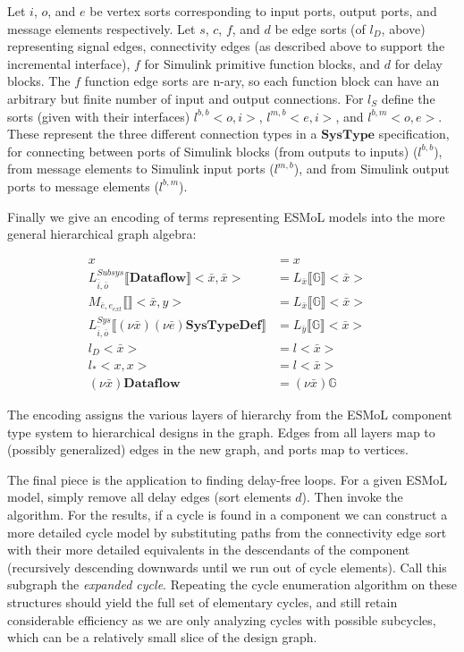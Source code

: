 Let $i$, $o$, and $e$ be vertex sorts corresponding to input ports, output 
ports, and message elements respectively.  Let $s$, $c$, $f$, and $d$ be
edge sorts (of $l_D$, above) representing signal edges, connectivity edges
(as described above to support the incremental interface), $f$ for Simulink
primitive function blocks, and $d$ for delay blocks.  The $f$ function edge
sorts are n-ary, so each function block can have an arbitrary but finite
number of input and output connections. For $l_S$ define the
sorts (given with their interfaces) $l^{b,b} < o, i >$, $l^{m,b} <e,i>$, 
and $l^{b,m} <o,e>$.  These represent the three different connection types in
a $\mathbf{SysType}$ specification, for connecting between ports of Simulink
blocks (from outputs to inputs) ($l^{b,b}$), from message elements to Simulink 
input ports ($l^{m,b}$), and from Simulink output ports to message elements
($l^{b,m}$).

Finally we give an encoding of terms representing ESMoL models into the more
general hierarchical graph algebra:

\begin{align}
x &= x & \nonumber \\
L_{\bar{i},\bar{o}}^{Subsys} \llbracket \mathbf{Dataflow} \rrbracket <\bar{x},\bar{x}> &= L_{\bar{x}} \llbracket \mathbb{G} \rrbracket < \bar{x} > & \nonumber \\
M_{\bar{e},e_{ext}} \llbracket \rrbracket <\bar{x}, y> &= L_{\bar{x}} \llbracket \mathbb{G} \rrbracket <\bar{x}> & \nonumber \\
L_{\bar{i},\bar{o}}^{Sys} \llbracket (\nu \bar{x})(\nu \bar{e}) \mathbf{SysTypeDef} \rrbracket &=  L_{\bar{y}} \llbracket \mathbb{G} \rrbracket <\bar{x}> & \\
l_D <\bar{x}> &= l <\bar{x}> & \nonumber \\
l_{*} <x,x> &= l <\bar{x}> & \nonumber \\
(\nu \bar{x}) \mathbf{Dataflow} &= (\nu \bar{x}) \mathbb{G} & \nonumber
\end{align}

The encoding assigns the various layers of hierarchy from the
ESMoL component type system to hierarchical designs in the graph.  Edges from
all layers map to (possibly generalized) edges in the new graph, and 
ports map to vertices.

The final piece is the application to finding delay-free loops.  For a given
ESMoL model, simply remove all delay edges (sort elements $d$).  Then invoke the algorithm.  For the results, if a cycle is found in a component we can 
construct a more detailed cycle model by substituting paths from the connectivity edge sort with their more detailed equivalents in the descendants of the component (recursively descending downwards until we run out of cycle elements).  Call this subgraph the \emph{expanded cycle}.  Repeating the cycle enumeration algorithm on these structures should yield the full set of elementary cycles, and still retain considerable efficiency as we are only analyzing cycles with possible subcycles, which can be a relatively small slice of the design graph.
